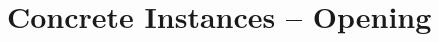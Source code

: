 \documentclass[11pt,oneside,openany]{book}
\begin{document}
\frontmatter
\mainmatter
\part{Concrete Instances -- Opening}

\end{document}
